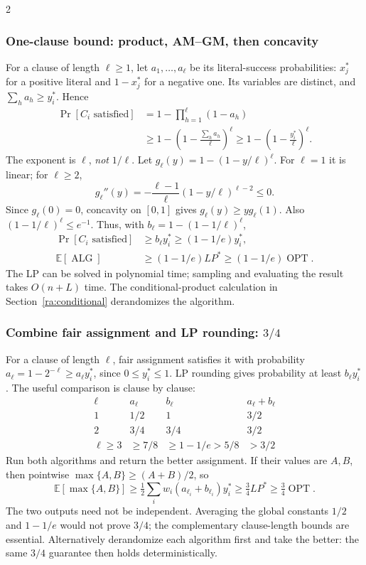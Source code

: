 \documentclass[8pt]{extarticle}
\theoremstyle{definition}
\newcommand{\OPT}{\operatorname{OPT}}
\newcommand{\ALG}{\operatorname{ALG}}
\begin{document}
\begin{multicols*}{2}
\subsubsection*{One-clause bound: product, AM--GM, then concavity}
For a clause of length $\ell\ge1$, let $a_1,\ldots,a_\ell$ be its
literal-success probabilities: $x_j^*$ for a positive literal and
$1-x_j^*$ for a negative one. Its variables are distinct, and
$\sum_h a_h\ge y_i^*$. Hence
\[
  \begin{aligned}
    \Pr[C_i\text{ satisfied}]
      &=1-\prod_{h=1}^{\ell}(1-a_h)\\
      &\ge1-\left(1-\frac{\sum_h a_h}{\ell}\right)^{\ell}
       \ge1-\left(1-\frac{y_i^*}{\ell}\right)^{\ell}.
  \end{aligned}
\]
The exponent is $\ell$, \emph{not} $1/\ell$.
Let $g_\ell(y)=1-(1-y/\ell)^\ell$. For $\ell=1$ it is linear; for
$\ell\ge2$,
\[
  g_\ell''(y)=-\frac{\ell-1}{\ell}(1-y/\ell)^{\ell-2}\le0.
\]
Since $g_\ell(0)=0$, concavity on $[0,1]$ gives
$g_\ell(y)\ge y g_\ell(1)$. Also
$(1-1/\ell)^\ell\le e^{-1}$. Thus, with
$b_\ell=1-(1-1/\ell)^\ell$,
\[
\begin{aligned}
  \Pr[C_i\text{ satisfied}]
    &\ge b_\ell y_i^*\ge(1-1/e)y_i^*,\\
  \mathbb E[\ALG]&\ge(1-1/e)LP^*\ge(1-1/e)\OPT.
\end{aligned}
\]
The LP can be solved in polynomial time; sampling and evaluating the result
takes $O(n+L)$ time. The conditional-product calculation in
Section~\ref{ra:conditional} derandomizes the algorithm.

\subsubsection*{Combine fair assignment and LP rounding: $3/4$}
For a clause of length $\ell$, fair assignment satisfies it with probability
$a_\ell=1-2^{-\ell}\ge a_\ell y_i^*$, since $0\le y_i^*\le1$.
LP rounding gives probability at least $b_\ell y_i^*$. The useful comparison
is clause by clause:
\[
  \begin{array}{c|c|c|c}
    \ell&a_\ell&b_\ell&a_\ell+b_\ell\\\hline
    1&1/2&1&3/2\\
    2&3/4&3/4&3/2\\
    \ell\ge3&\ge7/8&\ge1-1/e>5/8&>3/2
  \end{array}
\]
Run both algorithms and return the better assignment. If their values are
$A,B$, then pointwise $\max\{A,B\}\ge(A+B)/2$, so
\[
  \mathbb E[\max\{A,B\}]
    \ge\tfrac12\sum_iw_i(a_{\ell_i}+b_{\ell_i})y_i^*
    \ge\tfrac34LP^*\ge\tfrac34\OPT.
\]
The two outputs need not be independent. Averaging the global constants
$1/2$ and $1-1/e$ would not prove $3/4$; the complementary clause-length
bounds are essential. Alternatively derandomize each algorithm first and
take the better: the same $3/4$ guarantee then holds deterministically.


\end{multicols*}
\end{document}

